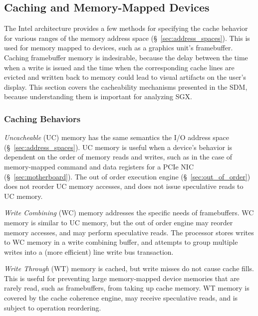 \subsection{Caching and Memory-Mapped Devices}
\label{sec:memory_io}

The Intel architecture provides a few methods for specifying the cache behavior
for various ranges of the memory address space (\S~\ref{sec:address_spaces}).
This is used for memory mapped to devices, such as a graphics unit's
framebuffer. Caching framebuffer memory is indesirable, because the delay
between the time when a write is issued and the time when the corresponding
cache lines are evicted and written back to memory could lead to visual
artifacts on the user's display. This section covers the cacheability
mechanisms presented in the SDM, because understanding them is important for
analyzing SGX.


\subsubsection{Caching Behaviors}
\label{sec:cacheability_options}


\textit{Uncacheable} (UC) memory has the same semantics the I/O address space
(\S~\ref{sec:address_spaces}). UC memory is useful when a device's behavior is
dependent on the order of memory reads and writes, such as in the case of
memory-mapped command and data registers for a PCIe NIC
(\S~\ref{sec:motherboard}). The out of order execution engine
(\S~\ref{sec:out_of_order}) does not reorder UC memory accesses, and does not
issue speculative reads to UC memory.

\textit{Write Combining} (WC) memory addresses the specific needs of
framebuffers. WC memory is similar to UC memory, but the out of order engine
may reorder memory accesses, and may perform speculative reads. The processor
stores writes to WC memory in a write combining buffer, and attempts to group
multiple writes into a (more efficient) line write bus transaction.

\textit{Write Through} (WT) memory is cached, but write misses do not cause
cache fills. This is useful for preventing large memory-mapped device memories
that are rarely read, such as framebuffers, from taking up cache memory. WT
memory is covered by the cache coherence engine, may receive speculative reads,
and is subject to operation reordering.

